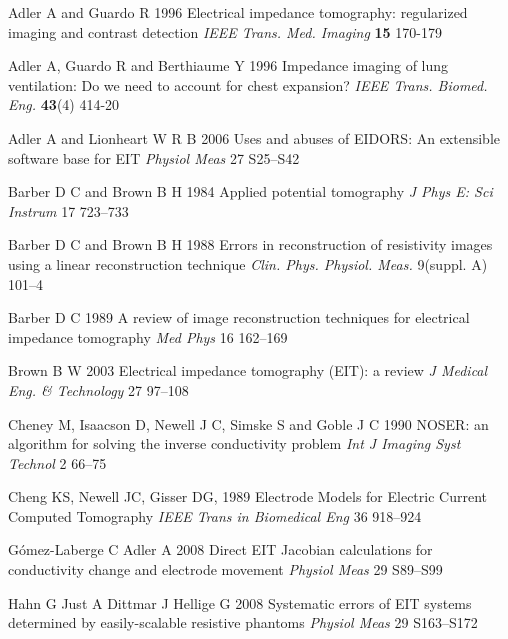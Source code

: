 \documentclass[12pt,draft]{iopart}
\begin{document}
\References %
\item[]
Adler A and Guardo R 1996 Electrical impedance tomography:
regularized imaging and contrast detection {\em IEEE Trans. Med.
Imaging} {\bf 15} 170-179

\item[]
Adler A, Guardo R and Berthiaume Y 1996 Impedance imaging of lung
ventilation: Do we need to account for chest expansion? {\em IEEE
Trans. Biomed. Eng.} {\bf 43}(4) 414-20


\item[]
Adler A and Lionheart W R B 2006
Uses and abuses of EIDORS: An extensible software base for EIT
{\em Physiol Meas}
27 S25--S42

%

\item[]
Barber D C and Brown B H 1984
Applied potential tomography
{\em J Phys E: Sci Instrum}
 17 723--733

\item[]
Barber D C and Brown B H 1988 Errors in reconstruction of
resistivity images using a linear reconstruction technique {\em
Clin. Phys. Physiol. Meas.} 
9(suppl. A) 101--4

\item[]
Barber D C 1989
A review of image reconstruction techniques for electrical
 impedance tomography
{\em Med Phys}
16 162--169


\item[]
Brown B W 2003
Electrical impedance tomography (EIT): a review
{\em J Medical Eng. \& Technology}
27 97--108


\item[]
Cheney M, Isaacson D, Newell J C, Simske S and Goble J C 1990
NOSER: an algorithm for solving the inverse conductivity problem
{\em Int J Imaging Syst Technol} 
2 66--75

\item[]
Cheng KS, Newell JC, Gisser DG, 1989
Electrode Models for Electric Current Computed Tomography
{\em IEEE Trans in Biomedical Eng}
36 918--924

\item[]
G\'omez-Laberge C Adler A 2008
Direct EIT Jacobian calculations for conductivity change and electrode movement
{\em Physiol Meas}
29 S89--S99


\item[]
Hahn G Just A Dittmar J  Hellige G 2008
Systematic errors of EIT systems determined by easily-scalable
 resistive phantoms
{\em Physiol Meas}
 29 S163--S172
 
\end{document}
